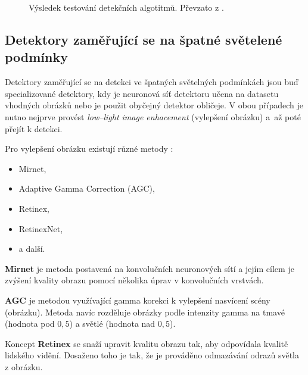 \begin{figure}[H]
  \begin{center}
  \label{obrazek:cnncomparison}
  \caption{Výsledek testování detekčních algotitmů. Převzato z \cite{fdCNNComparison}.}
  \end{center}
\end{figure}

\subsection*{Detektory zaměřující se na špatné světelené podmínky}
Detektory zaměřující se na detekci ve špatných světelných podmínkách jsou buď specializované detektory, kdy je neuronová síť detektoru učena na datasetu vhodných obrázků nebo je použit obyčejný detektor obličeje. V obou případech je nutno nejprve provést \emph{low--light image enhacement} (vylepšení obrázku) a~až poté přejít k detekci.

Pro vylepšení obrázku existují různé metody \cite{lowLightFdReview}:
\begin{itemize}
  \item Mirnet,
  \item Adaptive Gamma Correction (AGC),
  \item Retinex,
  \item RetinexNet,
  \item a další.
\end{itemize}

\textbf{Mirnet} je metoda postavená na konvolučních neuronových sítí a jejím cílem je zvýšení kvality obrazu pomocí několika úprav v konvolučních vrstvách.

\textbf{AGC} je metodou využívající gamma korekci k vylepšení nasvícení scény (obrázku). Metoda navíc rozděluje obrázky podle intenzity gamma na tmavé (hodnota pod $0,5$) a světlé (hodnota nad $0,5$).

Koncept \textbf{Retinex} se snaží upravit kvalitu obrazu tak, aby odpovídala kvalitě lidského vidění. Dosaženo toho je tak, že je prováděno odmazávání odrazů světla z obrázku.

